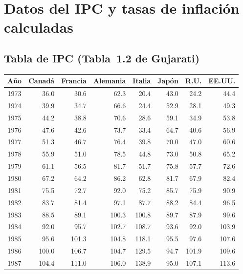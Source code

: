 \documentclass[12pt, letterpaper]{article}
\theoremstyle{remark}
\begin{document}
\section{Datos del IPC y tasas de inflaci\'on calculadas}

\subsection{Tabla de IPC (Tabla~1.2 de Gujarati)}

\begin{datebox}
\small
\centering
\captionsetup{type=table}
\vspace{4pt}
\begin{tabular}{crrrrrrr}
\toprule
\textbf{A\~no} & \textbf{Canad\'a} & \textbf{Francia} & \textbf{Alemania} & \textbf{Italia} & \textbf{Jap\'on} & \textbf{R.U.} & \textbf{EE.UU.} \\
\midrule
1973 & 36.0 & 30.6 & 62.3 & 20.4 & 43.0 & 24.2 & 44.4 \\
1974 & 39.9 & 34.7 & 66.6 & 24.4 & 52.9 & 28.1 & 49.3 \\
1975 & 44.2 & 38.8 & 70.6 & 28.6 & 59.1 & 34.9 & 53.8 \\
1976 & 47.6 & 42.6 & 73.7 & 33.4 & 64.7 & 40.6 & 56.9 \\
1977 & 51.3 & 46.7 & 76.4 & 39.8 & 70.0 & 47.0 & 60.6 \\
1978 & 55.9 & 51.0 & 78.5 & 44.8 & 73.0 & 50.8 & 65.2 \\
1979 & 61.1 & 56.5 & 81.7 & 51.7 & 75.8 & 57.7 & 72.6 \\
1980 & 67.2 & 64.2 & 86.2 & 62.8 & 81.7 & 67.9 & 82.4 \\
1981 & 75.5 & 72.7 & 92.0 & 75.2 & 85.7 & 75.9 & 90.9 \\
1982 & 83.7 & 81.4 & 97.1 & 87.7 & 88.2 & 84.4 & 96.5 \\
1983 & 88.5 & 89.1 & 100.3 & 100.8 & 89.7 & 87.9 & 99.6 \\
1984 & 92.0 & 95.7 & 102.7 & 108.7 & 93.6 & 92.0 & 103.9 \\
1985 & 95.6 & 101.3 & 104.8 & 118.1 & 95.5 & 97.6 & 107.6 \\
1986 & 100.0 & 106.7 & 104.7 & 129.5 & 94.7 & 101.9 & 109.6 \\
1987 & 104.4 & 111.0 & 106.0 & 138.9 & 95.0 & 107.1 & 113.6 \\

\end{tabular}
\end{datebox}
\end{document}
